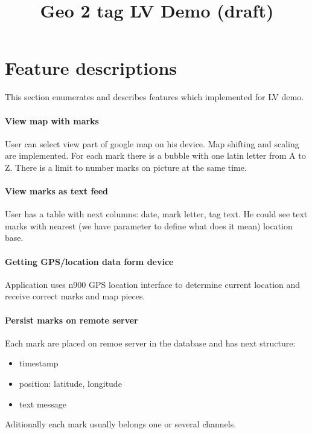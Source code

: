 \documentclass[12pt]{article}
\title{Geo 2 tag LV Demo (draft)}
\begin{document}
\maketitle          

\section{Feature descriptions}

This section enumerates and describes features which implemented
for LV demo. 

\paragraph{View map with marks}

User can select view part of google map on his device. Map shifting and scaling
are implemented. For each mark there is a bubble with one latin letter from 
A to Z. There is a limit to number marks on picture at the same time.

\paragraph{View marks as text feed}

User has a table with next columns: date, mark letter, tag text. He could see text marks
with nearest (we have parameter to define what does it mean) location base.

\paragraph{Getting GPS/location data form device}

Application uses n900 GPS location interface to determine current location and
receive correct marks and map pieces. 

\paragraph{Persist marks on remote server}

Each mark are placed on remoe server in the database and has next structure:
\begin{itemize}
  \item timestamp
  \item position: latitude, longitude
  \item text message
\end{itemize}

Aditionally each mark usually belongs one or several channels.
\end{document}
